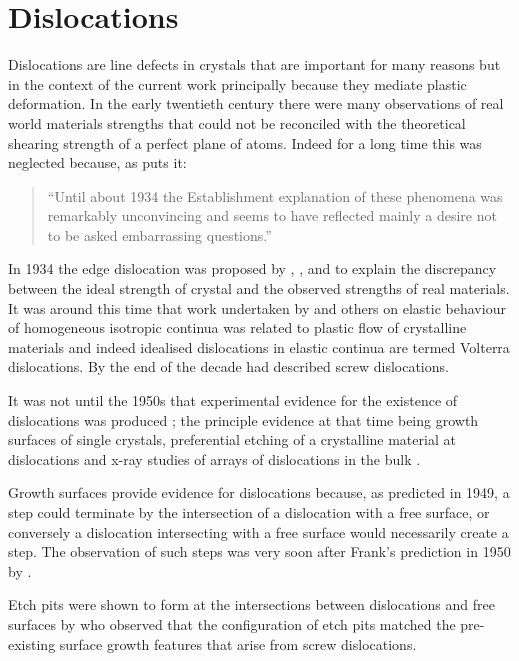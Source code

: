 \section{Dislocations} %

Dislocations are line defects in crystals that are important for many reasons but in the context of the current work principally because they mediate plastic deformation. In the early twentieth century there were many observations of real world materials strengths that could not be reconciled with the theoretical shearing strength of a perfect plane of atoms. Indeed for a long time this was neglected because, as \citet{gordon1991} puts it:
\begin{quote}
``Until about 1934 the Establishment explanation of these phenomena was remarkably unconvincing and seems to have reflected mainly a desire not to be asked embarrassing questions.''
\end{quote}

In 1934 the edge dislocation was proposed by \citet{orowan1934i,orowan1934ii,orowan1934iii}, \citet{Taylor1934}, and \citet{polanyi1934} to explain the discrepancy between the ideal strength of crystal and the observed strengths of real materials. It was around this time that work undertaken by \citet{Volterra1907} and others %
on elastic behaviour of homogeneous isotropic continua was related to plastic flow of crystalline materials and indeed idealised dislocations in elastic continua are termed Volterra dislocations. By the end of the decade \citet{burgers1939} had described screw dislocations.

It was not until the 1950s that experimental evidence for the existence of dislocations was produced ; the principle evidence at that time being growth surfaces of single crystals, preferential etching of a crystalline material at dislocations and x-ray studies of arrays of dislocations in the bulk \cite{Forty1954}. 

Growth surfaces provide evidence for dislocations because, as \citet{Frank1949} predicted in 1949, a step could terminate by the intersection of a dislocation with a free surface, or conversely a dislocation intersecting with a free surface would necessarily create a step. The observation of such steps was very soon after Frank's prediction in 1950 by \citet{Griffin1950}.

Etch pits were shown to form at the intersections between dislocations and free surfaces by \citet{Horn1952} who observed that the configuration of etch pits matched the pre-existing surface growth features that arise from screw dislocations.

